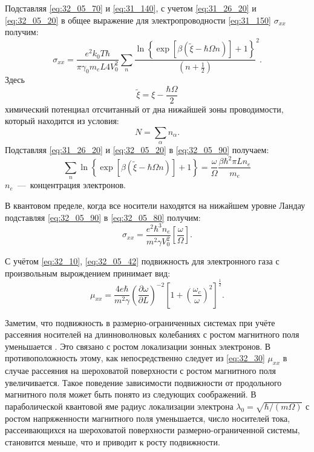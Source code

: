 Подставляя \eqref{eq:32_05_70} и \eqref{eq:31_140}, с учетом \eqref{eq:31_26_20} и \eqref{eq:32_05_20} в общее выражение для электропроводности \eqref{eq:31_150} $\sigma_{xx}$ получим:
\begin{equation} \label{eq:32_05_80}
\sigma_{xx} = \frac{e^2 k_0 T \hbar}{\pi \gamma_0 m_e L 4 V^2_0} \sum_n{\frac{\ln{\left\{\exp{\left[\beta \left(\widetilde{\xi}-\hbar \Omega n\right)\right]}+1\right\}}}{\left(n+\frac{1}{2}\right)}^2}. 
\end{equation}
Здесь
\[
\widetilde{\xi} = \xi -\frac{\hbar\Omega }{2}
\]
химический потенциал отсчитанный от дна нижайшей зоны проводимости, который находится из условия:
\begin{equation} \label{eq:32_05_90}
N=\sum_{\alpha }{n_{\alpha}}.
\end{equation}
Подставляя \eqref{eq:31_26_20} и \eqref{eq:32_05_20} в \eqref{eq:32_05_90} получаем:
\begin{equation} \label{eq:32_05_100}
\sum_n{\ln{\left\{\exp{\left[\beta \left(\widetilde{\xi}-\hbar \Omega n\right)\right]}+1\right\}}}=\frac{\omega }{\Omega } \frac{\beta \hbar^2 \pi L n_e}{m_e}
\end{equation}
$n_e$~---~концентрация электронов.

В квантовом пределе, когда все носители находятся на нижайшем уровне Ландау подставляя \eqref{eq:32_05_90} в \eqref{eq:32_05_80} получим:
\begin{equation} \label{eq:32_10}
\sigma_{xx} =\frac{e^2 \hbar^3 n_e}{m^2 \gamma V_0^2 } \left[\frac{\omega }{\Omega } \right].
\end{equation}

С учётом \eqref{eq:32_10}, \eqref{eq:32_05_42} подвижность для электронного газа с произвольным вырождением принимает вид:
\begin{equation} \label{eq:32_30}
\mu _{xx} =\frac{4e\hbar }{m^2 \gamma } \left(\frac{\partial \omega }{\partial L} \right)^{-2} \left[1+\left(\frac{\omega_c}{\omega } \right)^2 \right]^{\frac{1}{2} }.
\end{equation}

Заметим, что подвижность в размерно-ограниченных системах при учёте рассеяния носителей на длинноволновых колебаниях с ростом магнитного поля уменьшается \cite{Sinyavskii1998}. Это связано с ростом локализации зонных электронов. В противоположность этому, как непосредственно следует из \eqref{eq:32_30} $\mu_{xx} $ в случае рассеяния на шероховатой поверхности с ростом магнитного поля увеличивается. Такое поведение зависимости подвижности от продольного магнитного поля может быть понято из следующих соображений. В параболической квантовой яме радиус локализации электрона $\lambda_0 =\sqrt{\hbar / (m\Omega) } $ с ростом напряженности магнитного поля уменьшается, число носителей тока, рассеивающихся на шероховатой поверхности размерно-ограниченной системы, становится меньше, что и приводит к росту подвижности.

